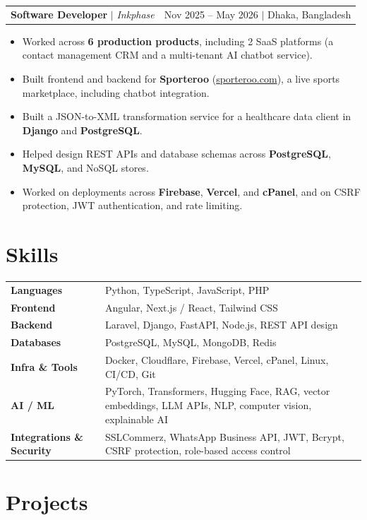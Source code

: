 \documentclass[letterpaper,10pt]{article}
\makeatletter
\newcommand{\cvsection}[1]{\needspace{5\baselineskip}\section{#1}}
\newcommand{\tworow}[2]{%
  \begin{tabular*}{\textwidth}{@{}l@{\extracolsep{\fill}}r@{}}#1 & #2\end{tabular*}\par}
\newcommand{\role}[3]{%
  \needspace{4\baselineskip}%
  \tworow{\textbf{#1} {\color{midgray}$|$} \textit{#2}}{\small #3}\vspace{1pt}}
\makeatother
\begin{document}
\vspace{3pt}
\role{Software Developer}{Inkphase}{Nov 2025 -- May 2026 {\color{midgray}$|$} Dhaka, Bangladesh}
\begin{itemize}
  \item Worked across \textbf{6 production products}, including 2 SaaS platforms (a contact management CRM and a multi-tenant AI chatbot service).
  \item Built frontend and backend for \textbf{Sporteroo} (\href{https://sporteroo.com}{sporteroo.com}), a live sports marketplace, including chatbot integration.
  \item Built a JSON-to-XML transformation service for a healthcare data client in \textbf{Django} and \textbf{PostgreSQL}.
  \item Helped design REST APIs and database schemas across \textbf{PostgreSQL}, \textbf{MySQL}, and NoSQL stores.
  \item Worked on deployments across \textbf{Firebase}, \textbf{Vercel}, and \textbf{cPanel}, and on CSRF protection, JWT authentication, and rate limiting.
\end{itemize}

\cvsection{Skills}

\begin{tabularx}{\textwidth}{@{}p{}X@{}}
  \textbf{Languages}      & Python, TypeScript, JavaScript, PHP \\[2pt]
  \textbf{Frontend}       & Angular, Next.js / React, Tailwind CSS \\[2pt]
  \textbf{Backend}        & Laravel, Django, FastAPI, Node.js, REST API design \\[2pt]
  \textbf{Databases}      & PostgreSQL, MySQL, MongoDB, Redis \\[2pt]
  \textbf{Infra \& Tools} & Docker, Cloudflare, Firebase, Vercel, cPanel, Linux, CI/CD, Git \\[2pt]
  \textbf{AI / ML}        & PyTorch, Transformers, Hugging Face, RAG, vector embeddings, LLM APIs, NLP, computer vision, explainable AI \\[2pt]
  \textbf{Integrations \& Security} & SSLCommerz, WhatsApp Business API, JWT, Bcrypt, CSRF protection, role-based access control \\
\end{tabularx}

\cvsection{Projects}
\end{document}
